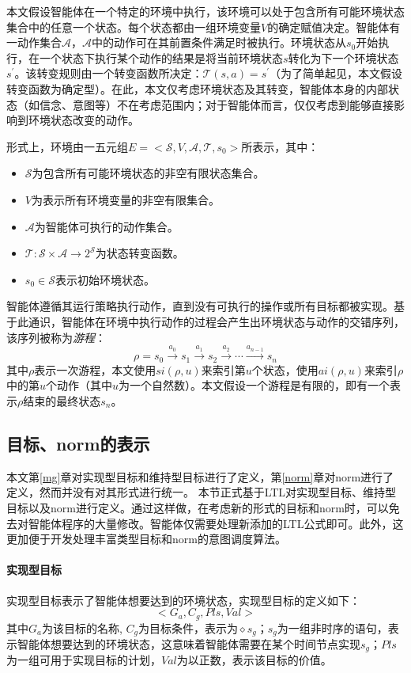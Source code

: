 本文假设智能体在一个特定的环境中执行，该环境可以处于包含所有可能环境状态集合中的任意一个状态。每个状态都由一组环境变量$V$的确定赋值决定。智能体有一动作集合$\mathcal{A}$，$\mathcal{A}$中的动作可在其前置条件满足时被执行。环境状态从$s_0$开始执行，在一个状态下执行某个动作的结果是将当前环境状态$s$转化为下一个环境状态$s^\prime$。该转变规则由一个转变函数所决定：$\mathcal{T} (s, a) = s^\prime$（为了简单起见，本文假设转变函数为确定型）。在此，本文仅考虑环境状态及其转变，智能体本身的内部状态（如信念、意图等）不在考虑范围内；对于智能体而言，仅仅考虑到能够直接影响到环境状态改变的动作。

形式上，环境由一五元组$E=<\mathcal{S}, V, \mathcal{A},\mathcal{T}, s_0>$所表示，其中：
\begin{itemize}
    \item $\mathcal{S}$为包含所有可能环境状态的非空有限状态集合。
    \item $V$为表示所有环境变量的非空有限集合。
    \item $\mathcal{A}$为智能体可执行的动作集合。
    \item $\mathcal{T}: \mathcal{S} \times \mathcal{A} \rightarrow 2^{\mathcal{S}}$为状态转变函数。
    \item $s_0 \in \mathcal{S}$表示初始环境状态。
\end{itemize}
智能体遵循其运行策略执行动作，直到没有可执行的操作或所有目标都被实现。基于此通识，智能体在环境中执行动作的过程会产生出环境状态与动作的交错序列，该序列被称为\emph{游程}：
\begin{equation}
\rho=s_0 \xrightarrow{\text{$a_0$}} s_1 \xrightarrow{\text{$a_1$}} s_2 \xrightarrow{\text{$a_2$}} \cdots \xrightarrow{\text{$a_{n-1}$}} s_n
\end{equation}
其中$\rho$表示一次游程，本文使用$si(\rho, u)$来索引第$u$个状态，使用$ai(\rho, u)$来索引$\rho$中的第$u$个动作（其中$u$为一个自然数）。本文假设一个游程是有限的，即有一个表示$\rho$结束的最终状态$s_n$。

\subsection{目标、norm的表示}
本文第\ref{mg}章对实现型目标和维持型目标进行了定义，第\ref{norm}章对norm进行了定义，然而并没有对其形式进行统一。
本节正式基于LTL对实现型目标、维持型目标以及norm进行定义。通过这样做，在考虑新的形式的目标和norm时，可以免去对智能体程序的大量修改。智能体仅需要处理新添加的LTL公式即可。此外，这更加便于开发处理丰富类型目标和norm的意图调度算法。

\paragraph{实现型目标}
实现型目标表示了智能体想要达到的环境状态，实现型目标的定义如下：
$$<G_a, C_g, Pls, Val>$$
其中$G_a$为该目标的名称, $C_g$为目标条件，表示为$\diamond s_g$；$s_g$为一组非时序的语句，表示智能体想要达到的环境状态，这意味着智能体需要在某个时间节点实现$s_g$；$Pls$为一组可用于实现目标的计划，$Val$为以正数，表示该目标的价值。

